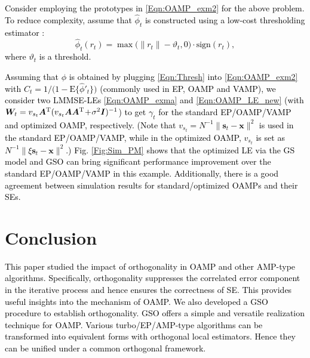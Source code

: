 \documentclass[journal]{IEEEtran}
\newcommand{\mr}{\mathrm}
\newcommand{\BE}{\begin{equation}}
\newcommand{\EE}{\end{equation}}
\renewcommand{\bf}{\bm}
\newcommand{\LL}[1]{\textcolor{black}{#1}}
\begin{document}
\LL{Consider employing the prototypes in \eqref{Eqn:OAMP_exm2} for the above problem. To reduce complexity, assume that $\hat{\phi}_t$ is constructed using a low-cost thresholding estimator \cite{Donoho1995}:
\BE\label{Eqn:Thresh}
\hat{\phi}_t(r_t)= \max\big(\|r_t\|-\vartheta_t, 0\big)\cdot \mr{sign}(r_t),
\EE
where $\vartheta_t$ is a threshold.}



\LL{Assuming that ${\phi}$ is obtained by plugging  \eqref{Eqn:Thresh} into \eqref{Eqn:OAMP_exm2} with $C_t=1/\big(1-\mr{E}\{\hat{ {\phi}}'_t\}\big)$ (commonly used in EP, OAMP and VAMP), we consider two LMMSE-LEs \eqref{Eqn:OAMP_exma} and \eqref{Eqn:OAMP_LE_new} (with ${\bf{W}}_t=v_{s_t}\bf{A}^{\rm T}(v_{s_t}\bf{A}\bf{A}^{\rm T} \!+\! \sigma^2\bf{I})^{-1}$)  to get $\gamma_t$ for the standard EP/OAMP/VAMP and optimized OAMP, respectively. (Note that $v_{s_t}=N^{-1}\|{\bm s}_t-{\bm x}\|^2$ is used in the standard EP/OAMP/VAMP, while in the optimized OAMP, $v_{s_t}$ is set as $N^{-1}\|\xi{\bm s}_t-{\bm x}\|^2$.) Fig. \ref{Fig:Sim_PM} shows that the optimized LE via the GS model and GSO can bring significant performance improvement over the standard EP/OAMP/VAMP in this example. Additionally, there is a good agreement between simulation results for standard/optimized OAMPs and their SEs.} %


 
 
 
\section{Conclusion}
\LL{This paper studied the impact of orthogonality in OAMP and other AMP-type algorithms. Specifically, orthogonality suppresses the correlated error component in the iterative process and hence ensures the correctness of SE. This provides useful insights into the mechanism of OAMP. We also developed a GSO procedure to establish orthogonality. GSO offers a simple and versatile realization technique for OAMP. Various turbo/EP/AMP-type algorithms can be transformed into equivalent forms with orthogonal local estimators. Hence they can be unified under a common orthogonal framework.} 
	
\end{document}
